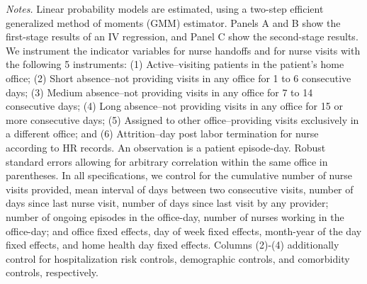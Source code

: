 \documentclass[final,12pt, notitlepage]{article}
\begin{document}
\begin{singlespace}
\begin{table}[H]
\begin{threeparttable}
{\begin{tabular*}{\textwidth}{l@{\extracolsep{\fill}}*{4}{c}}
\bottomrule
\end{tabular*}
}
	\begin{tablenotes}
	\scriptsize
	\item \emph{Notes.} Linear probability models are estimated, using a two-step efficient generalized method of moments (GMM) estimator.
	Panels A and B show the first-stage results of an IV regression, and Panel C show the second-stage results.
	We instrument the indicator variables for nurse handoffs and for nurse visits with the following 5 instruments:
(1) Active--visiting patients in the patient's home office;
(2) Short absence--not providing visits in any office for 1 to 6 consecutive days;
(3) Medium absence--not providing visits in any office for 7 to 14 consecutive days;
(4) Long absence--not providing visits in any office for 15 or more consecutive days;
(5) Assigned to other office--providing visits exclusively in a different office; and
(6) Attrition--day post labor termination for nurse according to HR records.
	An observation is a patient episode-day.
		Robust standard errors allowing for arbitrary correlation within the same office in parentheses.
		In all specifications, we control for the cumulative number of nurse visits provided, mean interval of days between two consecutive visits, number of days since last nurse visit, number of days since last visit by any provider; number of ongoing episodes in the office-day, number of nurses working in the office-day; and office fixed effects, day of week fixed effects, month-year of the day fixed effects, and home health day fixed effects.
		Columns (2)-(4) additionally control for hospitalization risk controls, demographic controls, and comorbidity controls, respectively.

\end{tablenotes}
\end{threeparttable}
\end{table}
\end{singlespace}
\end{document}
